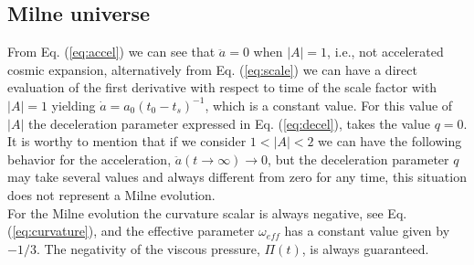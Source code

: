 \documentclass[twocolumn,showpacs,nofootinbib,floats,amsmath,amssymb]{revtex4}
\begin{document}
\subsection{Milne universe}
From Eq. (\ref{eq:accel}) we can see that $\ddot{a} = 0$ when $\left|A\right| = 1$, i.e., not accelerated cosmic expansion, alternatively from Eq. (\ref{eq:scale}) we can have a direct evaluation of the first derivative with respect to time of the scale factor with $\left|A\right| = 1$ yielding $\dot{a} = a_{0}(t_{0}-t_{s})^{-1}$, which is a constant value. For this value of $\left|A\right|$ the deceleration parameter expressed in Eq. (\ref{eq:decel}), takes the value $q = 0$.\\ 
It is worthy to mention that if we consider $1< \left|A\right| < 2$ we can have the following behavior for the acceleration, $\ddot{a}(t\rightarrow \infty) \rightarrow 0$, but the deceleration parameter $q$ may take several values ​​and always different from zero for any time, this situation does not represent a Milne evolution.\\ 
For the Milne evolution the curvature scalar is always negative, see Eq. (\ref{eq:curvature}), and the effective parameter $\omega_{eff}$ has a constant value given by $-1/3$. The negativity of the viscous pressure, $\Pi(t)$, is always guaranteed. 
\end{document}
